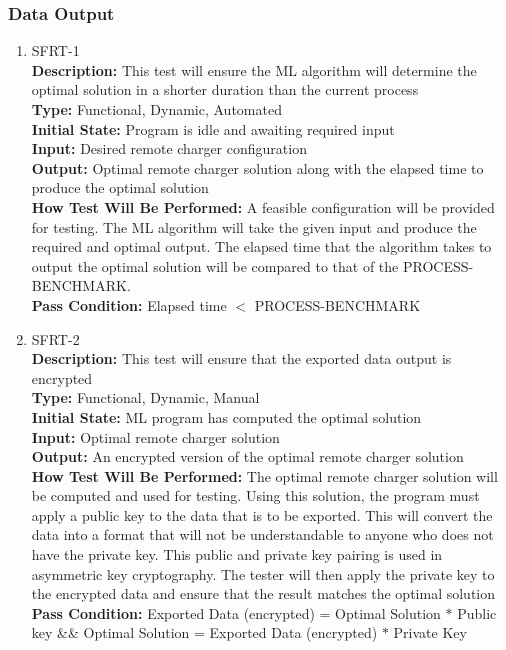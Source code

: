 \documentclass[12pt, titlepage]{article}
\begin{document}
\subsubsection{Data Output}
\begin{enumerate}
    \item{SFRT-1\\}
    \textbf{Description:} This test will ensure the ML algorithm will determine the optimal solution in a shorter duration than the current process\\
    \textbf{Type:} Functional, Dynamic, Automated\\
    \textbf{Initial State:} Program is idle and awaiting required input\\
    \textbf{Input:} Desired remote charger configuration\\
    \textbf{Output:} Optimal remote charger solution along with the elapsed time to produce the optimal solution\\
    \textbf{How Test Will Be Performed:} A feasible configuration will be provided for testing. The ML algorithm will take the given input and produce the required and optimal output. The elapsed time that the algorithm takes to output the optimal solution will be compared to that of the PROCESS-BENCHMARK.\\
    \textbf{Pass Condition:} Elapsed time $<$ PROCESS-BENCHMARK\\

    \item{SFRT-2\\}
    \textbf{Description:} This test will ensure that the exported data output is encrypted\\
    \textbf{Type:} Functional, Dynamic, Manual\\
    \textbf{Initial State:} ML program has computed the optimal solution\\
    \textbf{Input:} Optimal remote charger solution\\
    \textbf{Output:} An encrypted version of the optimal remote charger solution\\
    \textbf{How Test Will Be Performed:} The optimal remote charger solution will be computed and used for testing. Using this solution, the program must apply a public key to the data that is to be exported. This will convert the data into a format that will not be understandable to anyone who does not have the private key. This public and private key pairing is used in asymmetric key cryptography. The tester will then apply the private key to the encrypted data and ensure that the result matches the optimal solution\\
    \textbf{Pass Condition:} Exported Data (encrypted) = Optimal Solution $*$ Public key \&\& Optimal Solution = Exported Data (encrypted) $*$ Private Key\\


\end{enumerate}
\end{document}
